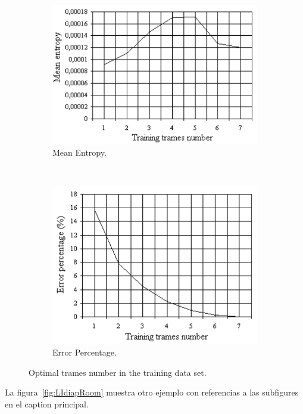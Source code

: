 \documentclass[spanish,openright]{book}
\begin{document}
\begin{figure}
\centering
\begin{subfigure}[b]{0.3\textwidth}
\includegraphics[width=\textwidth]{Figure2}
\caption{Mean Entropy.}
\label{fig:fig3a}
\end{subfigure}~ \begin{subfigure}[b]{0.3\textwidth}
\includegraphics[width=\textwidth]{Figure3}
\caption{Error Percentage.}
\label{fig:fig3b}
\end{subfigure}
\caption{Optimal trames number in the training data set.}
\label{fig:fig3}
\end{figure}

La figura~\ref{fig:LIdiapRoom} muestra otro ejemplo con referencias a
las subfigures en el caption principal.
\end{document}
